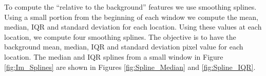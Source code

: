\documentclass[11pt]{article}
\begin{document}
	 To compute the ``relative to the background'' features  we use smoothing splines. Using a small portion from the beginning of each window we compute the mean, median, IQR and standard deviation for each location. Using these values at each location, we compute four smoothing splines. The objective is to have the background mean, median, IQR and standard deviation pixel value for each location.  The median and IQR splines from a small window in Figure \ref{fig:Im_Splines} are shown in Figures \ref{fig:Spline_Median} and \ref{fig:Spline_IQR}. %
	 
	\begin{figure}[H]
		 	\centering
\end{figure}
\end{document}
